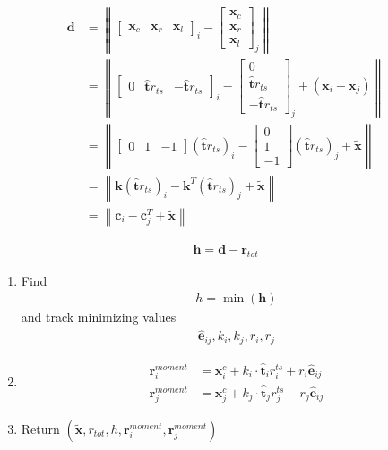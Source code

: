 \begin{align}
\mathbf{d} &= \left\|\begin{bmatrix} \mathbf{x}_{c} & \mathbf{x}_{r} & \mathbf{x}_{l} \end{bmatrix}_{i} - \begin{bmatrix} \mathbf{x}_{c} \\ \mathbf{x}_{r} \\ \mathbf{x}_{l} \end{bmatrix}_{j}\right\|
\\
&= \left\|\begin{bmatrix} 0 & \hat{\mathbf{t}} r_{ts} & -\hat{\mathbf{t}} r_{ts} \end{bmatrix}_{i} - \begin{bmatrix} 0 \\ \hat{\mathbf{t}} r_{ts} \\ -\hat{\mathbf{t}} r_{ts} \end{bmatrix}_{j}  + (\mathbf{x}_{i} - \mathbf{x}_{j}) \right\|
\\
&= \left\|\begin{bmatrix} 0 & 1 & -1 \end{bmatrix} \left(\hat{\mathbf{t}} r_{ts}\right)_{i} - \begin{bmatrix} 0 \\ 1 \\ -1 \end{bmatrix} \left(\hat{\mathbf{t}} r_{ts}\right)_{j}  + \tilde{\mathbf{x}} \right\|
\\
&= \left\| \mathbf{k} \left(\hat{\mathbf{t}} r_{ts}\right)_{i} - \mathbf{k}^{T} \left(\hat{\mathbf{t}} r_{ts}\right)_{j}  + \tilde{\mathbf{x}} \right\|
\\
&= \left\| \mathbf{c}_{i} - \mathbf{c}_{j}^{T}  + \tilde{\mathbf{x}} \right\|
\end{align}

\begin{align}
\mathbf{h} = \mathbf{d} - \mathbf{r}_{tot}
\end{align}

\begin{enumerate}
\item Find 
\begin{align}
h = \min(\mathbf{h})
\end{align}
and track minimizing values
\begin{align}
\hat{\mathbf{e}}_{ij}, k_{i}, k_{j}, r_{i}, r_{j}
\end{align}

\item 

\begin{align}
\mathbf{r}_{i}^{moment} &= \mathbf{x}_{i}^{c} + k_{i} \cdot \hat{\mathbf{t}}_{i} r_{i}^{ts} + r_{i} \hat{\mathbf{e}}_{ij} \\
\mathbf{r}_{j}^{moment} &= \mathbf{x}_{j}^{c} + k_{j} \cdot \hat{\mathbf{t}}_{j} r_{j}^{ts} - r_{j} \hat{\mathbf{e}}_{ij}
\end{align}

\item Return $ (\tilde{\mathbf{x}}, r_{tot}, h, \mathbf{r}_{i}^{moment}, \mathbf{r}_{j}^{moment}) $

\end{enumerate}


